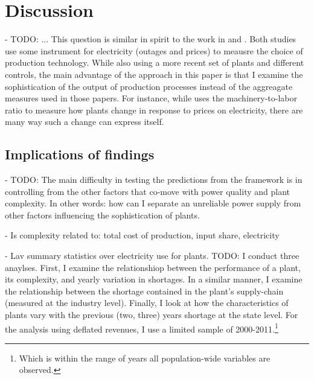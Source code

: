 \documentclass[11pt]{article}
\begin{document}

\newpage


\section{Discussion}%
\label{sec:discussion}

- TODO: ... This question is similar in spirit to the work in \cite{allcott_how_2016} and \cite{abeberese_electricity_2017}. Both studies use some instrument for electricity (outages and prices) to meausre the choice of production technology. While also using a more recent set of plants and different controls, the main advantage of the approach in this paper is that I examine the sophistication of the output of production processes instead of the aggreagate measures used in those papers. For instance, while \cite{abeberese_electricity_2017} uses the machinery-to-labor ratio to measure how plants change in response to prices on electricity, there are many way such a change can express itself. 

\subsection{Implications of findings}%
\label{sub:findings}

- TODO: The main difficulty in testing the predictions from the framework is in controlling from the other factors that co-move with power quality and plant complexity. In other words: how can I separate an unreliable power supply from other factors influencing the sophistication of plants. 

- Is complexity related to: total cost of production, input share, electricity 

- Lav summary statistics over electricity use for plants.
TODO: I conduct three anaylses. First, I examine the relationshiop between the performance of a plant, its complexity, and yearly variation in shortages. In a similar manner, I examine the relationship between the shortage contained in the plant's supply-chain (measured at the industry level). Finally, I look at how the characteristics of plants vary with the previous (two, three) years shortage at the state level. For the analysis using deflated revenues, I use a limited sample of 2000-2011.\footnote{Which is within the range of years all population-wide variables are observed.} 
\end{document}
